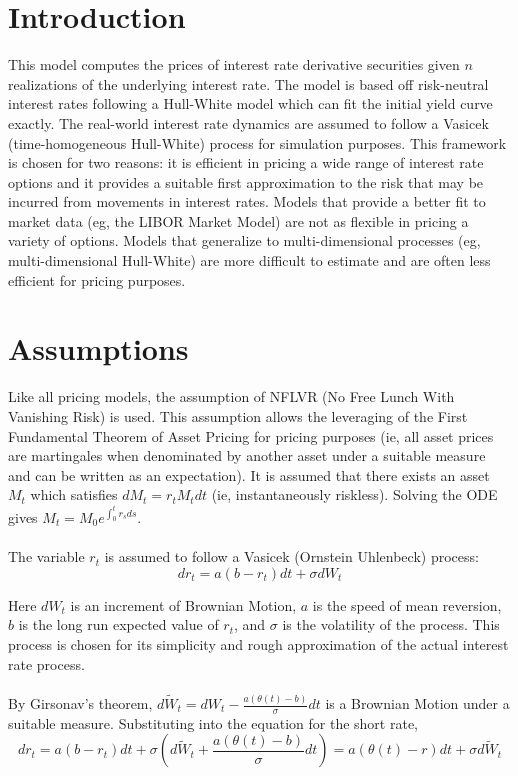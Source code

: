 \documentclass{article}
\theoremstyle{definition}
\begin{document}
\section{Introduction}

This model computes the prices of interest rate derivative securities given \(n\) realizations of the underlying interest rate.  The model is based off risk-neutral interest rates following a Hull-White model which can fit the initial yield curve exactly.  The real-world interest rate dynamics are assumed to follow a Vasicek (time-homogeneous Hull-White) process for simulation purposes.  This framework is chosen for two reasons: it is efficient in pricing a wide range of interest rate options and it provides a suitable first approximation to the risk that may be incurred from movements in interest rates.  Models that provide a better fit to market data (eg, the LIBOR Market Model) are not as flexible in pricing a variety of options.  Models that generalize to multi-dimensional processes (eg, multi-dimensional Hull-White) are more difficult to estimate and are often less efficient for pricing purposes.  

\section{Assumptions}

Like all pricing models, the assumption of NFLVR (No Free Lunch With Vanishing Risk) is used.  This assumption allows the leveraging of the First Fundamental Theorem of Asset Pricing for pricing purposes (ie, all asset prices are martingales when denominated by another asset under a suitable measure and can be written as an expectation).  It is assumed that there exists an asset \(M_t\) which satisfies \(dM_t=r_t M_t dt\) (ie, instantaneously riskless). Solving the ODE gives \(M_t=M_0 e^{\int_0 ^ t r_s ds}\). 
\\
\\
The variable \(r_t\) is assumed to follow a Vasicek (Ornstein Uhlenbeck) process: 
\[dr_t=a(b-r_t)dt+\sigma dW_t\]

Here \(dW_t\) is an increment of Brownian Motion, \(a\) is the speed of mean reversion, \(b\) is the long run expected value of \(r_t\), and \(\sigma\) is the volatility of the process. This process is chosen for its simplicity and rough approximation of the actual interest rate process.  
\\
\\

By Girsonav's theorem, \(d\tilde{W}_t=dW_t-\frac{a(\theta(t)-b)}{\sigma}dt\) is a Brownian Motion under a suitable measure.  Substituting into the equation for the short rate, 
\[dr_t=a(b-r_t)dt+\sigma\left(d\tilde{W}_t+\frac{a(\theta(t)-b)}{\sigma}dt\right)=a(\theta(t)-r)dt+\sigma d\tilde{W}_t\]
\end{document}
